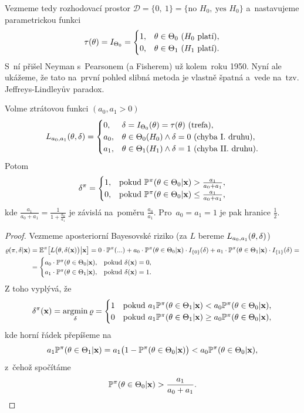 Vezmeme tedy rozhodovací prostor $\mathscr{D}=\{0,~1\}=\{\text{no }H_0,~\text{yes }H_0\}$ a~nastavujeme parametrickou funkci
$$ \tau(\theta)=I_{\Theta_0}=\begin{cases}
1,& \theta\in\Theta_0~(H_0\text{ platí}),\\0,& \theta\in\Theta_1~(H_1\text{ platí}).
\end{cases}$$ S~ní přišel Neyman s~Pearsonem (a Fisherem) už kolem~roku 1950. Nyní ale ukážeme, že tato na~první pohled slibná metoda je vlastně špatná a~vede na~tzv. Jeffreys-Lindleyův paradox. 
\begin{theorem}
	Volme ztrátovou funkci $(a_0,a_1>0)$ $$L_{a_0,a_1}(\theta,\delta)=\begin{cases}
	0,&\delta=I_{\Theta_0}(\theta)=\tau(\theta)~(\text{trefa}),\\a_0,& \theta\in\Theta_0(H_0)\wedge \delta=0~(\text{chyba I. druhu}),\\a_1,& \theta\in\Theta_1(H_1)\wedge \delta=1~(\text{chyba II. druhu}).
	\end{cases}$$
	Potom $$\delta^\pi=\begin{cases}
	1,& \text{pokud }\mathbb{P}^\pi(\theta\in\Theta_0|\textbf{x})>\frac{a_1}{a_0+a_1},\\
	0,& \text{pokud }\mathbb{P}^\pi(\theta\in\Theta_0|\textbf{x})\leq\frac{a_1}{a_0+a_1},
	\end{cases}$$ kde $\frac{a_1}{a_0+a_1}=\frac{1}{1+\frac{a_0}{a_1}}$ je závislá na~poměru $\frac{a_0}{a_1}$. Pro~$a_0=a_1=1$ je pak hranice $\frac{1}{2}$.
	\begin{proof}
		Vezmeme aposteriorní Bayesovské riziko (za $L$ bereme $L_{a_0,a_1}(\theta,\delta)$)
		\[
		\begin{split}
		\varrho(\pi,\delta|\textbf{x})&=\mathbb{E}^\pi\big[L\big(\theta,\delta(\textbf{x})\big)\big| \textbf{x}\big]=0\cdot\mathbb{P}^{\pi}(...)+a_0\cdot \mathbb{P}^\pi(\theta\in\Theta_0|\textbf{x})\cdot I_{\{0\}}(\delta)+a_1 \cdot\mathbb{P}^\pi (\theta\in\Theta_1|\textbf{x})\cdot I_{\{1\}}(\delta)=\\&=\begin{cases}
		a_0\cdot \mathbb{P}^\pi(\theta\in\Theta_0|\textbf{x}),&\text{pokud }\delta(\textbf{x})=0,\\
		a_1\cdot \mathbb{P}^\pi(\theta\in\Theta_1|\textbf{x}),&\text{pokud }\delta(\textbf{x})=1.
		\end{cases}
		\end{split}
		\]
		Z toho vyplývá, že
		$$ \delta^\pi(\textbf{x})=\mathop{\mathrm{argmin}}_\delta \varrho=\begin{cases}
		1&\text{pokud }a_1\mathbb{P}^\pi(\theta\in\Theta_1|\textbf{x})<a_0\mathbb{P}^\pi(\theta\in\Theta_0|\textbf{x}),\\
		0&\text{pokud }a_1\mathbb{P}^\pi(\theta\in\Theta_1|\textbf{x})\geq a_0\mathbb{P}^\pi(\theta\in\Theta_0|\textbf{x}),\\
		\end{cases} $$
		kde horní řádek přepíšeme na~$$a_1\mathbb{P}^\pi(\theta\in\Theta_1|\textbf{x})=a_1\big(1-\mathbb{P}^\pi(\theta\in\Theta_0|\textbf{x})\big)<a_0\mathbb{P}^\pi(\theta\in\Theta_0|\textbf{x}),$$ z~čehož spočítáme $$\mathbb{P}^\pi(\theta\in\Theta_0|\textbf{x})>\frac{a_1}{a_0+a_1}.$$
	\end{proof}
\end{theorem}
